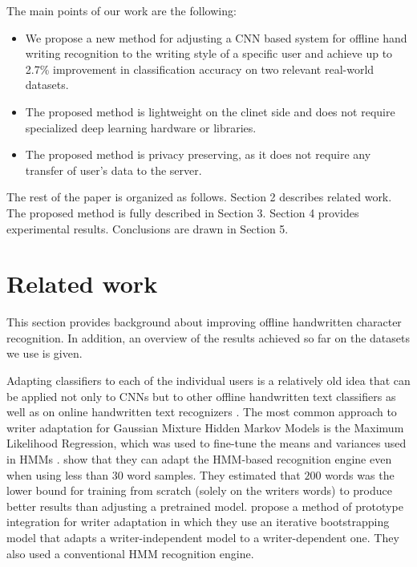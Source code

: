 \documentclass{article}
\begin{document}
The main points of our work are the following:
\begin{itemize}
\item We propose a new method for adjusting a CNN based system for offline hand writing recognition to the writing style of a specific user and achieve up to 2.7\% improvement in classification accuracy on two relevant real-world datasets.
\item The proposed method is lightweight on the clinet side and does not require specialized deep learning hardware or libraries.
\item The proposed method is privacy preserving, as it does not require any transfer of user's data to the server.
\end{itemize}

The rest of the paper is organized as follows. Section 2 describes related work. The proposed method is fully described in Section 3. Section 4 provides experimental results. Conclusions are drawn in Section 5.

\section{Related work}  %

This section provides background about improving offline handwritten character recognition.
In addition, an overview of the results achieved so far on the datasets we use is given.

Adapting classifiers to each of the individual users is a relatively old idea that can be applied not only to CNNs but to other offline handwritten text classifiers 
as well as on online handwritten text recognizers \citep{adapt3, adapt2, adapt7}. 
The most common approach to writer adaptation for Gaussian Mixture Hidden Markov Models is the Maximum Likelihood Regression, 
which was used to fine-tune the means and variances used in HMMs \citep{adapt1, adapt4}. 
\citet{adapt6} show that they can adapt the HMM-based recognition engine even when using less than $30$ word samples. 
They estimated that $200$ words was the lower bound for training from scratch (solely on the writers words) to produce better results than adjusting a pretrained model. 
\citep{adapt5} propose a method of prototype integration for writer adaptation in which they use an iterative bootstrapping model that adapts a writer-independent model to a writer-dependent one. 
They also used a conventional HMM recognition engine. 
\end{document}
